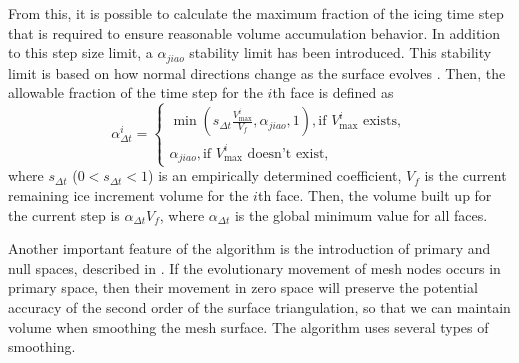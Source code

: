 \documentclass[
11pt,%
tightenlines,%
twoside,%
onecolumn,%
nofloats,%
nobibnotes,%
nofootinbib,%
superscriptaddress,%
noshowpacs,%
centertags]%
{revtex4-2}
\begin{document}
From this, it is possible to calculate the maximum fraction of the icing time step that is required to ensure reasonable volume accumulation behavior.
In addition to this step size limit, a $\alpha_{jiao}$ stability limit has been introduced.
This stability limit is based on how normal directions change as the surface evolves \cite{Jiao}.
Then, the allowable fraction of the time step for the $i$th face is
defined as
\begin{equation}\label{Tong:2}
\alpha_{\Delta t}^i=
\begin{cases}
\min(s_{\Delta t}\frac{V_{\max}^i}{V_f},\alpha_{jiao},1), \text{if $V_{\max}^i$ exists}, \\
\alpha_{jiao}, \text{if $V_{\max}^i$ doesn't exist},
\end{cases}
\end{equation}
where $s_{\Delta t}$ ($0 < s_{\Delta t} < 1$) is an  empirically
determined coefficient, $V_f$ is the current remaining ice increment
volume for the $i$th face.
Then, the volume built up for the current step is $\alpha_{\Delta t}
V_f$, where $\alpha_{\Delta t}$ is the global minimum value for all
faces.

Another important feature of the algorithm is the introduction of primary and null spaces, described in \cite{Jiao_null_space_smooth}.
If the evolutionary movement of mesh nodes occurs in primary space, then their movement in zero space will preserve the potential accuracy of the second order of the surface triangulation, so that we can maintain volume when smoothing the mesh surface.
The algorithm uses several types of smoothing.
\end{document}
